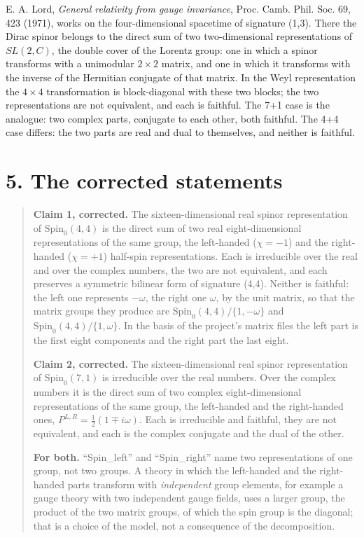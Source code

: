 \documentclass[
  10pt,
]{article}
\begin{document}
E. A. Lord, \emph{General relativity from gauge invariance}, Proc. Camb.
Phil. Soc. 69, 423 (1971), works on the four-dimensional spacetime of
signature (1,3). There the Dirac spinor belongs to the direct sum of two
two-dimensional representations of \(SL(2,C)\), the double cover of the
Lorentz group: one in which a spinor transforms with a unimodular
\(2\times2\) matrix, and one in which it transforms with the inverse of
the Hermitian conjugate of that matrix. In the Weyl representation the
\(4\times4\) transformation is block-diagonal with these two blocks; the
two representations are not equivalent, and each is faithful. The 7+1
case is the analogue: two complex parts, conjugate to each other, both
faithful. The 4+4 case differs: the two parts are real and dual to
themselves, and neither is faithful.

\hypertarget{the-corrected-statements}{%
\section{5. The corrected statements}\label{the-corrected-statements}}

\begin{quote}
\textbf{Claim 1, corrected.} The sixteen-dimensional real spinor
representation of \(\mathrm{Spin}_0(4,4)\) is the direct sum of two real
eight-dimensional representations of the same group, the left-handed
(\(\chi=-1\)) and the right-handed (\(\chi=+1\)) half-spin
representations. Each is irreducible over the real and over the complex
numbers, the two are not equivalent, and each preserves a symmetric
bilinear form of signature (4,4). Neither is faithful: the left one
represents \(-\omega\), the right one \(\omega\), by the unit matrix, so
that the matrix groups they produce are
\(\mathrm{Spin}_0(4,4)/\{1,-\omega\}\) and
\(\mathrm{Spin}_0(4,4)/\{1,\omega\}\). In the basis of the project's
matrix files the left part is the first eight components and the right
part the last eight.

\textbf{Claim 2, corrected.} The sixteen-dimensional real spinor
representation of \(\mathrm{Spin}_0(7,1)\) is irreducible over the real
numbers. Over the complex numbers it is the direct sum of two complex
eight-dimensional representations of the same group, the left-handed and
the right-handed ones, \(P^{L,R}=\tfrac12(1\mp i\omega)\). Each is
irreducible and faithful, they are not equivalent, and each is the
complex conjugate and the dual of the other.

\textbf{For both.} ``Spin\_left'' and ``Spin\_right'' name two
representations of one group, not two groups. A theory in which the
left-handed and the right-handed parts transform with \emph{independent}
group elements, for example a gauge theory with two independent gauge
fields, uses a larger group, the product of the two matrix groups, of
which the spin group is the diagonal; that is a choice of the model, not
a consequence of the decomposition.
\end{quote}
\end{document}

